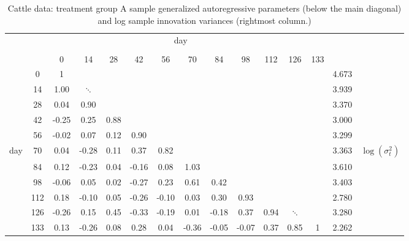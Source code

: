 \begin{table}[H] 
\begin{center}
\begin{tabular}{lc|ccccccccccc|cr}
 \multicolumn{14}{c}{day} \\
&&&&&&&&&&&&\\
& &  0 & 14 & 28 & 42 & 56 & 70 & 84 & 98 & 112 & 126 & 133  \\ 
  \cline{2-13}\noalign{\smallskip}  
&0 & 1 & &&&&&&&&& & 4.673& \\ 
&  14& 1.00 & $\ddots$&&&&&&&&&& 3.939 &\\ 
&  28 & 0.04 & 0.90 &  &&&&&&&&& 3.370&\\ 
&  42 & -0.25 & 0.25 & 0.88 &  &&&&&&&&3.000& \\ 
&  56 & -0.02 & 0.07 & 0.12 & 0.90 & &&&&&&& 3.299&\\ 
day &  70 & 0.04 & -0.28 & 0.11 & 0.37 & 0.82  &&&&&&& 3.363 & $\log\left(\sigma^2_t\right)$\\ 
 & 84 & 0.12 & -0.23 & 0.04 & -0.16 & 0.08 & 1.03  &&&&&& 3.610\\ 
 & 98 & -0.06 & 0.05 & 0.02 & -0.27 & 0.23 & 0.61 & 0.42 &&&&& 3.403&\\ 
 & 112 & 0.18 & -0.10 & 0.05 & -0.26 & -0.10 & 0.03 & 0.30 & 0.93&&&& 2.780&  \\ 
 & 126 & -0.26 & 0.15 & 0.45 & -0.33 & -0.19 & 0.01 & -0.18 & 0.37 & 0.94 & $\ddots$&&3.280& \\ 
 & 133 & 0.13 & -0.26 & 0.08 & 0.28 & 0.04 & -0.36 & -0.05 & -0.07 & 0.37 & 0.85 & 1  &2.262&\\ 
\end{tabular} 
\caption{Cattle data: treatment group A sample generalized autoregressive parameters (below the main diagonal) and log sample innovation variances (rightmost column.)}\label{table:sample-regressogram-garps}
\end{center}
\end{table}

